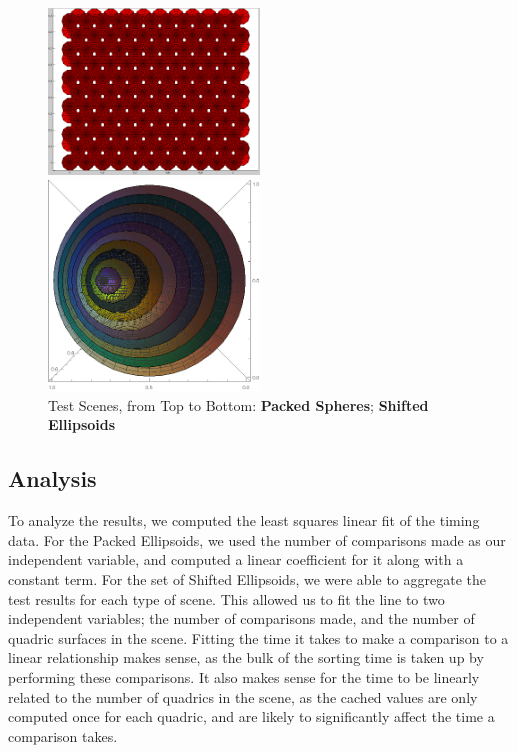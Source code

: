 \documentclass{cccg16}
\begin{document}
\begin{figure}
  \includegraphics[width=0.5\textwidth]{imgs/packedSpheres.png}
  
  \vspace{5mm}
  
  \includegraphics[width=0.5\textwidth]{imgs/hardEllipsoidsSingle.png}
  \caption{Test Scenes, from Top to Bottom:
    {\bf Packed Spheres};
    {\bf Shifted Ellipsoids}}
  \label{fig:testScenes}
\end{figure}

\subsection{Analysis}
To analyze the results, we computed the least squares linear fit of
the timing data.  For the Packed Ellipsoids, we used the number of
comparisons made as our independent variable, and computed a linear
coefficient for it along with a constant term.  For the set of Shifted
Ellipsoids, we were able to aggregate the test results for each type
of scene.  This allowed us to fit the line to two independent
variables; the number of comparisons made, and the number of quadric
surfaces in the scene.  Fitting the time it takes to make a comparison
to a linear relationship makes sense, as the bulk of the sorting time
is taken up by performing these comparisons.  It also makes sense for
the time to be linearly related to the number of quadrics in the
scene, as the cached values are only computed once for each quadric,
and are likely to significantly affect the time a comparison takes.
\end{document}

